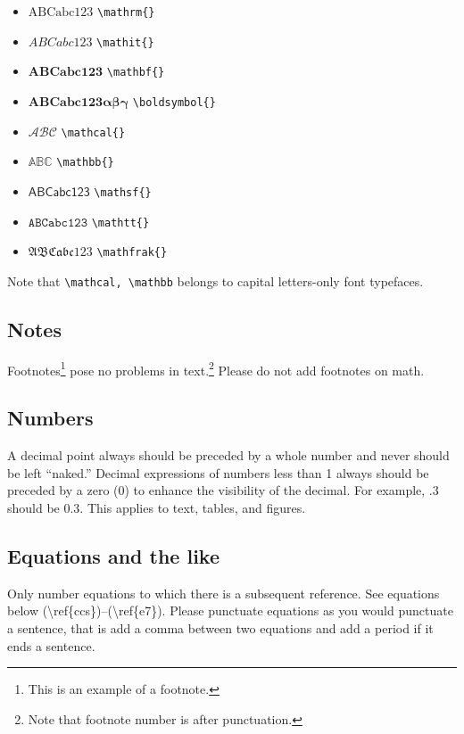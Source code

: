 \documentclass[qe,nameyear,draft]{econsocart}
\theoremstyle{plain}
\theoremstyle{remark}
\begin{document}
\begin{itemize}
\item $\mathrm{ABCabc123}$ \texttt{{\textbackslash}mathrm\{\}}
\item $\mathit{ABCabc123}$ \texttt{{\textbackslash}mathit\{\}}
\item $\mathbf{ABCabc123}$ \texttt{{\textbackslash}mathbf\{\}}
\item $\boldsymbol{ABCabc123\alpha\beta\gamma}$ \texttt{{\textbackslash}boldsymbol\{\}}
\item $\mathcal{ABC}$ \texttt{{\textbackslash}mathcal\{\}}
\item $\mathbb{ABC}$ \texttt{{\textbackslash}mathbb\{\}}
\item $\mathsf{ABCabc123}$ \texttt{{\textbackslash}mathsf\{\}}
\item $\mathtt{ABCabc123}$ \texttt{{\textbackslash}mathtt\{\}}
\item $\mathfrak{ABCabc123}$ \texttt{{\textbackslash}mathfrak\{\}}
\end{itemize}

Note that \texttt{{\textbackslash}mathcal, {\textbackslash}mathbb} belongs to capital letters-only font typefaces.

\subsection{Notes}

Footnotes\footnote{This is an example of a footnote.} pose no problems in text.\footnote{Note that footnote number is after punctuation.} Please do not add footnotes on math.

\subsection{Numbers}

A decimal point always should be preceded by a whole number and never should be left ``naked.'' Decimal expressions of numbers less than 1 always should be preceded by a zero (0) to enhance the visibility of the decimal. For example, .3 should be 0.3. This applies to text, tables, and figures.

\subsection{Equations and the like}

Only number equations to which there is a subsequent reference.
See equations below ({\textbackslash}ref\{ccs\})--({\textbackslash}ref\{e7\}). Please punctuate equations as you would punctuate a sentence, that is add a comma between two equations and add a period if it ends a sentence.
\end{document}
